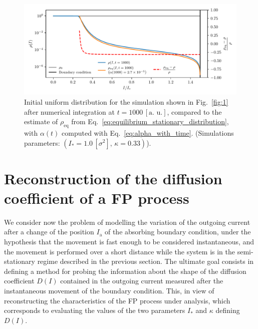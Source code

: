 \begin{figure}[htp]
    \centering
    \includegraphics[width=\textwidth]{4_probing_the_diffusive_behavior/figs/final/new_stationary_distribution_s.pdf}
    \caption{Initial uniform distribution for the simulation shown in Fig.~\ref{fig:1} after numerical integration at $t=1000 \, [\text{a. u.}]$, compared to the estimate of $\rho_\mathrm{eq}$ from Eq.~\eqref{eq:equilibrium_stationary_distribution}, with $\alpha(t)$ computed with Eq.~\eqref{eq:alpha_with_time}. (Simulations parameters: $(I_\ast = 1.0\,[\sigma^2],\, \kappa = 0.33)$).}
    \label{fig:3}
\end{figure}


\section{Reconstruction of the diffusion coefficient of a FP process}
\label{sec:moving_the_absorbing_barrier}


We consider now the problem of modelling the variation of the outgoing current after a change of the position $I_\mathrm{a}$ of the absorbing boundary condition, under the hypothesis that the movement is fast enough to be considered instantaneous, and the movement is performed over a short distance while the system is in the semi-stationary regime described in the previous section. The ultimate goal consists in defining a method for probing the information about the shape of the diffusion coefficient $D(I)$ contained in the outgoing current measured after the instantaneous movement of the boundary condition. This, in view of reconstructing the characteristics of the FP process under analysis, which corresponds to evaluating the values of the two parameters $I_\ast$ and $\kappa$ defining $D(I)$.

